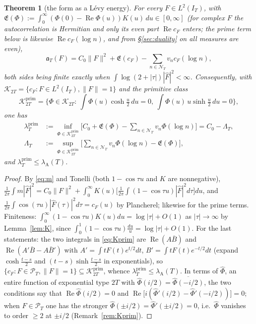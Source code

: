 \documentclass[11pt]{amsart}
\newtheorem{theorem}{Theorem}[section]
\theoremstyle{definition}
\theoremstyle{remark}
\newcommand{\Rel}{\operatorname{Re}}
\newcommand{\Kp}{\mathcal K^{\mathrm{prim}}_{2T}}
\newcommand{\Kw}{\mathcal K_{2T}}
\newcommand{\PT}{\mathcal P_T}
\newcommand{\IT}{I_T}
\newcommand{\lamP}{\lambda^{\mathrm{prim}}_T}
\newcommand{\lamA}{\lambda_{\mathrm A}(T)}
\newcommand{\Fh}{\widehat F}
\newcommand{\cF}{c_F}
\newcommand{\Lev}{\mathfrak E}
\newcommand{\NT}{\mathcal N_T}
\begin{document}
\begin{theorem}[the form as a L\'evy energy]\label{thm:A}
For every $F\in L^2(\IT)$, with $\Lev(\Phi):=\int_0^\infty(\Phi(0)-\Rel\Phi(u))K(u)\,du\in[0,\infty]$
(for complex $F$ the autocorrelation is Hermitian and only its even part $\Rel\cF$ enters; the
prime term below is likewise $\Rel\cF(\log n)$, and from \S\ref{sec:duality} on all measures are even),
\begin{equation}\label{eq:Aform}
\mathfrak a_T(F)=C_0\|F\|^2+\Lev(\cF)-\sum_{n\in\NT}v_n\cF(\log n),
\end{equation}
both sides being finite exactly when $\int\log(2+|\tau|)|\Fh|^2<\infty$. Consequently, with
$\Kw=\{\cF:F\in L^2(\IT),\|F\|=1\}$ and the primitive class
\begin{equation}\label{eq:Kprim}
\Kp=\Big\{\Phi\in\Kw:\ \int\Phi(u)\cosh\tfrac u2\,du=0,\ \int\Phi(u)\,u\sinh\tfrac u2\,du=0\Big\},
\end{equation}
one has
\begin{align*}
\lamP&:=\inf_{\Phi\in\Kp}\Big[C_0+\Lev(\Phi)-\sum_{n\in\NT}v_n\Phi(\log n)\Big]=C_0-\Lambda_T,\\
\Lambda_T&:=\sup_{\Phi\in\Kp}\Big[\sum_{n\in\NT}v_n\Phi(\log n)-\Lev(\Phi)\Big],
\end{align*}
and $\lamP\le\lamA$.
\end{theorem}
\begin{proof}
By \eqref{eq:m} and Tonelli (both $1-\cos\tau u$ and $K$ are nonnegative),
$\frac1{2\pi}\int m|\Fh|^2=C_0\|F\|^2+\int_0^\infty K(u)\Big[\frac1{2\pi}\int(1-\cos\tau u)|\Fh|^2d\tau\Big]du$,
and $\frac1{2\pi}\int\cos(\tau u)|\Fh(\tau)|^2d\tau=\cF(u)$ by Plancherel; likewise for the
prime terms. Finiteness: $\int_0^\infty(1-\cos\tau u)K(u)du=\log|\tau|+O(1)$ as $|\tau|\to\infty$
by Lemma~\ref{lem:K}, since $\int_0^1(1-\cos\tau u)\frac{du}u=\log|\tau|+O(1)$. For the last
statements: the two integrals in \eqref{eq:Kprim} are $\Rel(A\bar B)$ and $\Rel(A'\bar B-A\bar B')$
with $A'=\int tF(t)e^{t/2}dt$, $B'=\int tF(t)e^{-t/2}dt$ (expand $\cosh\frac{t-s}2$ and
$(t-s)\sinh\frac{t-s}2$ in exponentials), so $\{\cF:F\in\PT,\|F\|=1\}\subseteq\Kp$, whence
$\lamP\le\lamA$. In terms of $\widehat\Phi$, an entire function of exponential type $2T$ with
$\widehat\Phi(i/2)=\overline{\widehat\Phi(-i/2)}$, the two conditions say that
$\Rel\widehat\Phi(i/2)=0$ and $\Rel\big[i(\widehat\Phi'(i/2)-\widehat\Phi'(-i/2))\big]=0$; when
$F\in\PT$ one has the stronger $\widehat\Phi(\pm i/2)=\widehat\Phi'(\pm i/2)=0$, i.e.\ $\widehat\Phi$
vanishes to order $\ge2$ at $\pm i/2$ (Remark~\ref{rem:Kprim}).
\end{proof}
\end{document}
